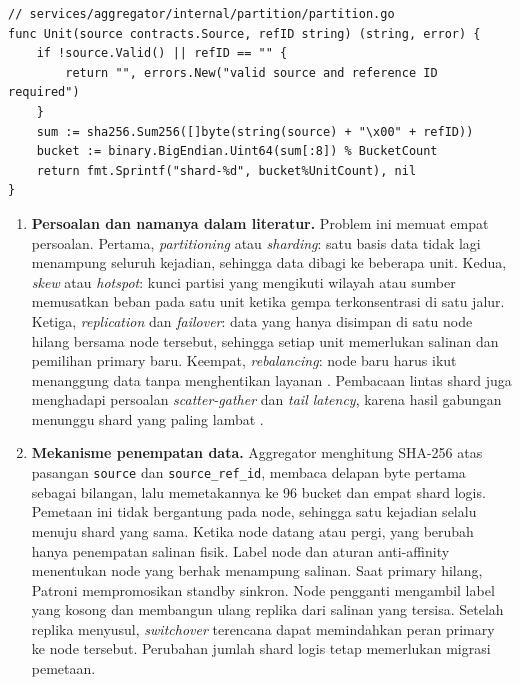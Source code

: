 \noindent\begin{minipage}{\linewidth}
\begin{lstlisting}[caption={Penentuan shard dari identitas kejadian.},label={code:p1-partition}]
// services/aggregator/internal/partition/partition.go
func Unit(source contracts.Source, refID string) (string, error) {
	if !source.Valid() || refID == "" {
		return "", errors.New("valid source and reference ID required")
	}
	sum := sha256.Sum256([]byte(string(source) + "\x00" + refID))
	bucket := binary.BigEndian.Uint64(sum[:8]) % BucketCount
	return fmt.Sprintf("shard-%d", bucket%UnitCount), nil
}
\end{lstlisting}
\end{minipage}


\begin{enumerate}
\item \textbf{Persoalan dan namanya dalam literatur.} Problem ini memuat empat persoalan. Pertama, \emph{partitioning} atau \emph{sharding}: satu basis data tidak lagi menampung seluruh kejadian, sehingga data dibagi ke beberapa unit. Kedua, \emph{skew} atau \emph{hotspot}: kunci partisi yang mengikuti wilayah atau sumber memusatkan beban pada satu unit ketika gempa terkonsentrasi di satu jalur. Ketiga, \emph{replication} dan \emph{failover}: data yang hanya disimpan di satu node hilang bersama node tersebut, sehingga setiap unit memerlukan salinan dan pemilihan primary baru. Keempat, \emph{rebalancing}: node baru harus ikut menanggung data tanpa menghentikan layanan \cite{kleppmann2017}. Pembacaan lintas shard juga menghadapi persoalan \emph{scatter-gather} dan \emph{tail latency}, karena hasil gabungan menunggu shard yang paling lambat \cite{dean2013}.

\item \textbf{Mekanisme penempatan data.} Aggregator menghitung SHA-256 atas pasangan \texttt{source} dan \texttt{source\_ref\_id}, membaca delapan byte pertama sebagai bilangan, lalu memetakannya ke 96 bucket dan empat shard logis. Pemetaan ini tidak bergantung pada node, sehingga satu kejadian selalu menuju shard yang sama. Ketika node datang atau pergi, yang berubah hanya penempatan salinan fisik. Label node dan aturan anti-affinity menentukan node yang berhak menampung salinan. Saat primary hilang, Patroni mempromosikan standby sinkron. Node pengganti mengambil label yang kosong dan membangun ulang replika dari salinan yang tersisa. Setelah replika menyusul, \emph{switchover} terencana dapat memindahkan peran primary ke node tersebut. Perubahan jumlah shard logis tetap memerlukan migrasi pemetaan.


\end{enumerate}
